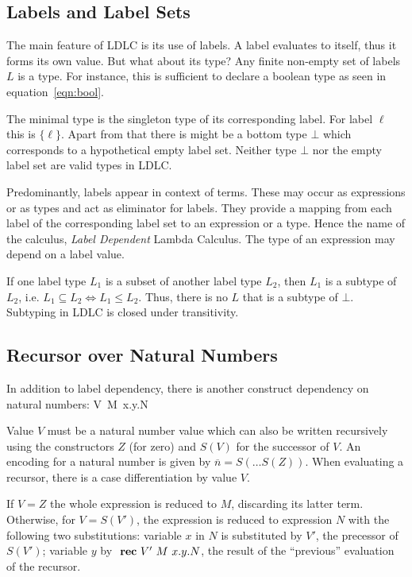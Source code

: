 \subsection{Labels and Label Sets}

The main feature of LDLC is its use of labels. A label evaluates to itself, thus it forms its own value. But what about its type? Any finite non-empty set of labels $L$ is a type. For instance, this is sufficient to declare a boolean type as seen in equation~\ref{eqn:bool}.

The minimal type is the singleton type of its corresponding label. For label $\ell$ this is $\{\ell\}$. Apart from that there is might be a bottom type $\bot$ which corresponds to a hypothetical empty label set. Neither type $\bot$ nor the empty label set are valid types in LDLC.

Predominantly, labels appear in context of \case terms. These may occur as expressions or as types and act as eliminator for labels. They provide a mapping from each label of the corresponding label set to an expression or a type. Hence the name of the calculus, \emph{Label Dependent} Lambda Calculus. The type of an expression may depend on a label value.

If one label type $L_1$ is a subset of another label type $L_2$, then $L_1$ is a subtype of $L_2$, i.e. $L_1 \subseteq L_2 \Leftrightarrow L_1 \leq L_2$. Thus, there is no $L$ that is a subtype of $\bot$. Subtyping in LDLC is closed under transitivity.

\subsection{Recursor over Natural Numbers}

In addition to label dependency, there is another construct dependency on natural numbers: \rec V~M~x.y.N

Value $V$ must be a natural number value which can also be written recursively using the constructors $Z$ (for zero) and $S(V)$ for the successor of $V$. An encoding for a natural number is given by $\overline{n} = S(\dots S(Z))$. When evaluating a recursor, there is a case differentiation by value $V$.

If $V=Z$ the whole expression is reduced to $M$, discarding its latter term. Otherwise, for $V=S(V')$, the \rec expression is reduced to expression $N$ with the following two substitutions: variable $x$ in $N$ is substituted by $V'$, the precessor of $S(V')$; variable $y$ by $\text{ \textbf{rec} } V'~M~x.y.N$, the result of the ``previous'' evaluation of the recursor.


